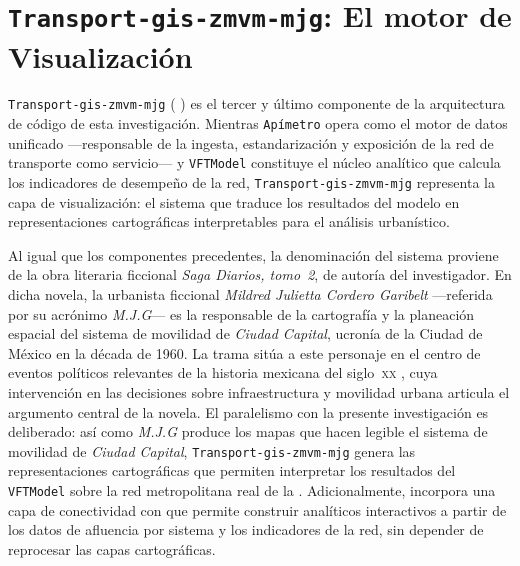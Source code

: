 
\section{\texorpdfstring{\texttt{Transport-gis-zmvm-mjg}}{Transport-gis-zmvm-mjg}: El motor de Visualización}
\label{sec:transport-gis}
\label{sec:transport-gis-intro}

\texttt{Transport-gis-zmvm-mjg} (
)
es el tercer y último componente de la arquitectura de código de esta
investigación. Mientras \texttt{Apímetro} opera como el motor de datos unificado
—responsable de la ingesta, estandarización y exposición de la red de transporte
como servicio— y \texttt{VFTModel} constituye el núcleo analítico que calcula
los indicadores de desempeño de la red, \texttt{Transport-gis-zmvm-mjg} representa la
capa de visualización: el sistema que traduce los resultados del modelo en
representaciones cartográficas interpretables para el análisis urbanístico.

Al igual que los componentes precedentes, la denominación del sistema proviene
de la obra literaria ficcional \textit{Saga Diarios, tomo~2}, de autoría del
investigador. En dicha novela, la urbanista ficcional
\textit{Mildred Julietta Cordero Garibelt} —referida por su acrónimo
\textit{M.J.G}— es la responsable de la cartografía y la planeación espacial del
sistema de movilidad de \textit{Ciudad Capital}, ucronía de la Ciudad de México
en la década de 1960. La trama sitúa a este personaje en el centro de eventos
políticos relevantes de la historia mexicana del siglo~\textsc{xx}
\citep{lopezmateos2023comoelcantodelcisne}, cuya intervención en las decisiones
sobre infraestructura y movilidad urbana articula el argumento central de la
novela. El paralelismo con la presente investigación es deliberado: así como
\textit{M.J.G} produce los mapas que hacen legible el sistema de movilidad de
\textit{Ciudad Capital}, \texttt{Transport-gis-zmvm-mjg} genera las representaciones
cartográficas que permiten interpretar los resultados del \texttt{VFTModel}
sobre la red metropolitana real de la \zmvm{}. Adicionalmente, incorpora una
capa de conectividad con  que permite construir
 analíticos interactivos a partir de los datos de afluencia por sistema
y los indicadores de la red, sin depender de reprocesar las capas cartográficas.
